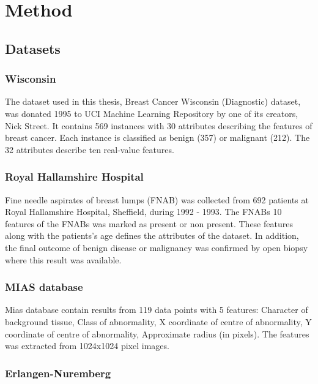 \chapter{Method}

\section{Datasets}
\label{sec:Datasets}


\subsection{Wisconsin}

The dataset used in this thesis, Breast Cancer Wisconsin (Diagnostic) dataset, was donated 1995 to UCI  Machine Learning Repository \parencite{dua:2017} by one of its creators, Nick Street. It contains 569 instances with 30 attributes describing the features of breast cancer. Each instance is classified as benign (357) or malignant (212). The 32 attributes describe ten real-value features.

\subsection{Royal Hallamshire Hospital}

Fine needle aspirates of breast lumps (FNAB) was collected from 692 patients at Royal Hallamshire Hospital, Sheffield, during 1992 - 1993. The FNABs 10 features of the FNABs was marked as present or non present. These features along with the patients's age defines the attributes of the dataset. In addition, the final outcome of benign disease or malignancy was confirmed by open biopsy where this result was available.

\subsection{MIAS database}

Mias database contain results from 119 data points with 5 features: Character of background tissue, Class of abnormality, X coordinate of centre of abnormality, Y coordinate of centre of abnormality, Approximate radius (in pixels). The features was extracted from 1024x1024 pixel images.

\subsection{Erlangen-Nuremberg}

